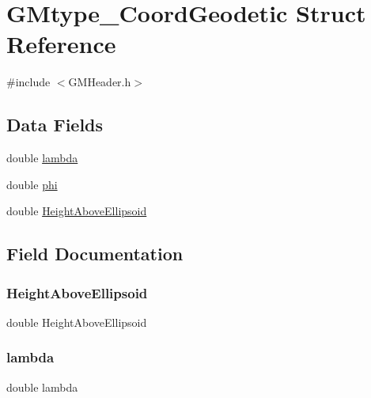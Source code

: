 \hypertarget{struct_g_mtype___coord_geodetic}{}\section{G\+Mtype\+\_\+\+Coord\+Geodetic Struct Reference}
\label{struct_g_mtype___coord_geodetic}


{\ttfamily \#include $<$G\+M\+Header.\+h$>$}

\subsection*{Data Fields}
\begin{DoxyCompactItemize}
\item 
double \mbox{\hyperlink{struct_g_mtype___coord_geodetic_a3db359547eed8cfd48ca821d95f577af}{lambda}}
\item 
double \mbox{\hyperlink{struct_g_mtype___coord_geodetic_adae8d8a6ff28515e505bb1c07f2b33c8}{phi}}
\item 
double \mbox{\hyperlink{struct_g_mtype___coord_geodetic_a47a5987864ed61d4803e07eeb04e8e92}{Height\+Above\+Ellipsoid}}
\end{DoxyCompactItemize}


\subsection{Field Documentation}
\mbox{\label{struct_g_mtype___coord_geodetic_a47a5987864ed61d4803e07eeb04e8e92}} 
\subsubsection{\texorpdfstring{HeightAboveEllipsoid}{HeightAboveEllipsoid}}
{\footnotesize\ttfamily double Height\+Above\+Ellipsoid}

\mbox{\label{struct_g_mtype___coord_geodetic_a3db359547eed8cfd48ca821d95f577af}} 
\subsubsection{\texorpdfstring{lambda}{lambda}}
{\footnotesize\ttfamily double lambda}

